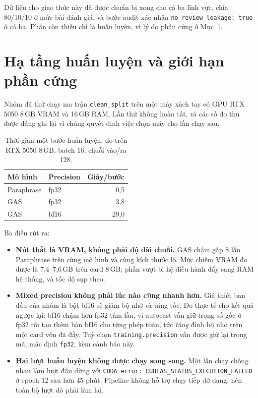 \documentclass[12pt,a4paper]{report}
\newcommand{\code}[1]{\texttt{#1}}
\begin{document}
Dữ liệu cho giao thức này đã được chuẩn bị xong cho cả ba lĩnh vực, chia 80/10/10 ở mức bài đánh giá, và bước audit xác
nhận \code{no\_review\_leakage: true} ở cả ba. Phần còn thiếu chỉ là huấn luyện, vì lý do phần cứng ở
Mục~\ref{sec:phancung}.

\section{Hạ tầng huấn luyện và giới hạn phần cứng}
\label{sec:phancung}

Nhóm đã thử chạy ma trận \code{clean\_split} trên một máy xách tay có GPU RTX 5050 8\,GB VRAM và 16\,GB RAM. Lần thử
không hoàn tất, và các số đo thu được đáng ghi lại vì chúng quyết định việc chọn máy cho lần chạy sau.

\begin{table}[H]
\centering
\caption{Thời gian một bước huấn luyện, đo trên RTX 5050 8\,GB, batch 16, chuỗi vào/ra 128.}
\label{tab:tocdo}
\begin{tabular}{llr}
\toprule
\textbf{Mô hình} & \textbf{Precision} & \textbf{Giây/bước} \\
\midrule
Paraphrase & fp32 & 0,5 \\
GAS & fp32 & 3,8 \\
GAS & bf16 & 29,0 \\
\bottomrule
\end{tabular}
\end{table}

Ba điều rút ra:

\begin{itemize}
  \item \textbf{Nút thắt là VRAM, không phải độ dài chuỗi.} GAS chậm gấp 8 lần Paraphrase trên cùng mô hình và cùng
        kích thước lô. Mức chiếm VRAM đo được là 7{,}4--7{,}6\,GB trên card 8\,GB; phần vượt bị hệ điều hành đẩy sang
        RAM hệ thống, và tốc độ sụp theo.
  \item \textbf{Mixed precision không phải lúc nào cũng nhanh hơn.} Giả thiết ban đầu của nhóm là bật bf16 sẽ giảm bộ
        nhớ và tăng tốc. Đo thực tế cho kết quả ngược lại: bf16 chậm hơn fp32 tám lần, vì autocast vẫn giữ trọng số
        gốc ở fp32 rồi tạo thêm bản bf16 cho từng phép toán, tức \emph{tăng} đỉnh bộ nhớ trên một card vốn đã đầy.
        Tuỳ chọn \code{training.precision} vẫn được giữ lại trong mã, mặc định \code{fp32}, kèm cảnh báo này.
  \item \textbf{Hai lượt huấn luyện không được chạy song song.} Một lần chạy chồng nhau làm lượt đầu dừng với
        \code{CUDA error: CUBLAS\_STATUS\_EXECUTION\_FAILED} ở epoch 12 sau hơn 45 phút. Pipeline không hỗ trợ chạy
        tiếp dở dang, nên toàn bộ lượt đó phải làm lại.
\end{itemize}
\end{document}
